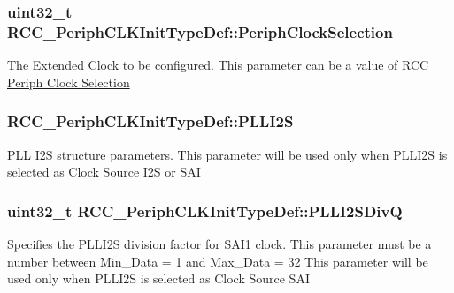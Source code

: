 \subsubsection[{\texorpdfstring{Periph\+Clock\+Selection}{PeriphClockSelection}}]{\setlength{\rightskip}{0pt plus 5cm}uint32\+\_\+t R\+C\+C\+\_\+\+Periph\+C\+L\+K\+Init\+Type\+Def\+::\+Periph\+Clock\+Selection}\hypertarget{struct_r_c_c___periph_c_l_k_init_type_def_a1fe6e3d75864d85b911eef15dfc35925}{}\label{struct_r_c_c___periph_c_l_k_init_type_def_a1fe6e3d75864d85b911eef15dfc35925}
The Extended Clock to be configured. This parameter can be a value of \hyperlink{group___r_c_c_ex___periph___clock___selection}{R\+CC Periph Clock Selection} 
\subsubsection[{\texorpdfstring{P\+L\+L\+I2S}{PLLI2S}}]{ R\+C\+C\+\_\+\+Periph\+C\+L\+K\+Init\+Type\+Def\+::\+P\+L\+L\+I2S}\hypertarget{struct_r_c_c___periph_c_l_k_init_type_def_acc2f1ab5bca1f524c6dc9f7b8dce747d}{}\label{struct_r_c_c___periph_c_l_k_init_type_def_acc2f1ab5bca1f524c6dc9f7b8dce747d}
P\+LL I2S structure parameters. This parameter will be used only when P\+L\+L\+I2S is selected as Clock Source I2S or S\+AI 
\subsubsection[{\texorpdfstring{P\+L\+L\+I2\+S\+DivQ}{PLLI2SDivQ}}]{\setlength{\rightskip}{0pt plus 5cm}uint32\+\_\+t R\+C\+C\+\_\+\+Periph\+C\+L\+K\+Init\+Type\+Def\+::\+P\+L\+L\+I2\+S\+DivQ}\hypertarget{struct_r_c_c___periph_c_l_k_init_type_def_a158247326a43b3ce7eb1d2907ced6234}{}\label{struct_r_c_c___periph_c_l_k_init_type_def_a158247326a43b3ce7eb1d2907ced6234}
Specifies the P\+L\+L\+I2S division factor for S\+A\+I1 clock. This parameter must be a number between Min\+\_\+\+Data = 1 and Max\+\_\+\+Data = 32 This parameter will be used only when P\+L\+L\+I2S is selected as Clock Source S\+AI 

